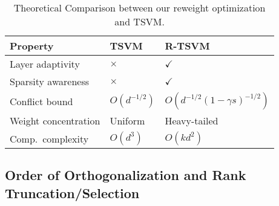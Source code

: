 \begin{table}[ht]
    \centering
    \footnotesize  %
    \setlength{\tabcolsep}{5pt}  %
    \caption{Theoretical Comparison between our reweight optimization and TSVM.}
    \label{tab:theory}
    \begin{tabular}{@{} l >{\centering\arraybackslash}p{1.8cm} >{\centering\arraybackslash}p{2cm} @{}} %
        \toprule
        \textbf{Property}    & \textbf{TSVM} & \textbf{R-TSVM}                    \\
        \midrule
        Layer adaptivity     & $\times$      & $\checkmark$                       \\
        Sparsity awareness   & $\times$      & $\checkmark$                       \\
        Conflict bound       & $O(d^{-1/2})$ & $O(d^{-1/2}(1{-}\gamma s)^{-1/2})$ \\
        Weight concentration & Uniform       & Heavy-tailed                       \\
        Comp.\ complexity    & $O(d^3)$      & $O(k d^2)$                         \\
        \bottomrule
    \end{tabular}
\end{table}



\subsection{Order of Orthogonalization and Rank Truncation/Selection}
\label{sec:order}

